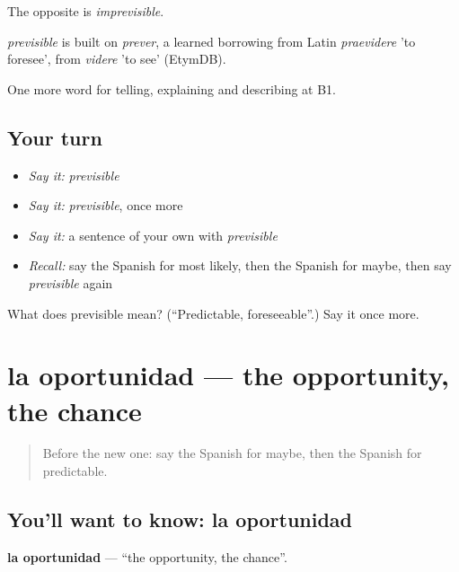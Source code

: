 The opposite is \emph{imprevisible}.

\begin{cousinweb}
\emph{previsible} is built on \emph{prever}, a learned borrowing from Latin \emph{praevidere} 'to foresee', from \emph{videre} 'to see' (EtymDB).
\end{cousinweb}

\begin{grammarlens}[title={What you've built}]
One more word for telling, explaining and describing at B1.
\end{grammarlens}

\subsection*{Your turn}
\begin{itemize}
\raggedright
  \item \emph{Say it:} \emph{previsible}
  \item \emph{Say it:} \emph{previsible}, once more
  \item \emph{Say it:} a sentence of your own with \emph{previsible}
  \item \emph{Recall:} say the Spanish for most likely, then the Spanish for maybe, then say \emph{previsible} again
\end{itemize}

\begin{tcolorbox}[breakable,colback=teal!4,colframe=teal!35!black,title={Before you move on}]
What does previsible mean? (\textquotedblleft{}Predictable, foreseeable\textquotedblright{}.) Say it once more.
\end{tcolorbox}
\section[la oportunidad]{la oportunidad — the opportunity, the chance}

\label{lesson:ES-C619-oportunidad}



\begin{quote}
Before the new one: say the Spanish for maybe, then the Spanish for predictable.
\end{quote}

\subsection*{You'll want to know: la oportunidad}
\textbf{la oportunidad} — \textquotedblleft{}the opportunity, the chance\textquotedblright{}.

